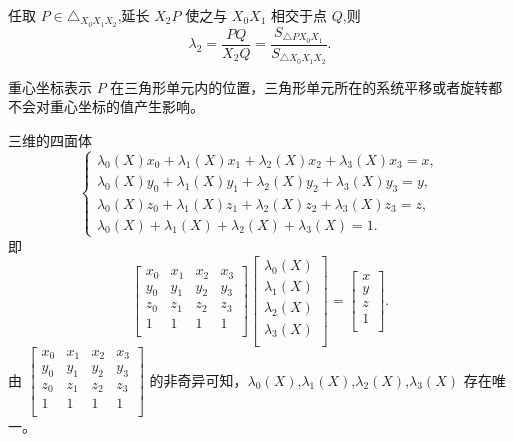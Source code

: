 \documentclass[12pt,a4paper]{article}
\begin{document}
任取 $P\in \triangle_{X_0 X_1 X_2}$,延长 $X_2 P$ 使之与 $X_0 X_1$ 相交于点 $Q$,则
$$
\lambda _2=\frac {PQ}{X_2 Q}=\frac{S_{\triangle PX_0 X_1}}{S_{\triangle X_0 X_1 X_2}}.
$$

重心坐标表示 $P$ 在三角形单元内的位置，三角形单元所在的系统平移或者旋转都不会对重心坐标的值产生影响。

三维的四面体
$$
\begin{cases}
\lambda _0(X)x_0+\lambda _1(X)x_1+\lambda _2(X)x_2+\lambda _3(X)x_3=x,\\
\lambda _0(X)y_0+\lambda _1(X)y_1+\lambda _2(X)y_2+\lambda _3(X)y_3=y,\\
\lambda _0(X)z_0+\lambda _1(X)z_1+\lambda _2(X)z_2+\lambda _3(X)z_3=z,\\
\lambda _0(X)+\lambda _1(X)+\lambda _2(X)+\lambda _3(X)=1.
\end{cases}
$$
即
$$
\begin{bmatrix}
x_0 & x_1 & x_2 & x_3\\
y_0 & y_1 & y_2 & y_3\\
z_0 & z_1 & z_2 & z_3\\
1 & 1 & 1 &1\\
\end{bmatrix}
\begin{bmatrix}
\lambda _0(X)\\
\lambda _1(X)\\
\lambda _2(X)\\
\lambda _3(X)\\
\end{bmatrix}=\begin{bmatrix}
x\\
y\\
z\\
1\\
\end{bmatrix}.
$$
由 $\begin{bmatrix}
x_0 & x_1 & x_2 & x_3\\
y_0 & y_1 & y_2 & y_3\\
z_0 & z_1 & z_2 & z_3\\
1 & 1 & 1 &1\\
\end{bmatrix}$ 的非奇异可知，$\lambda _0(X)$,$\lambda _1(X)$,$\lambda _2(X)$,$\lambda _3(X)$ 存在唯一。
\end{document}

